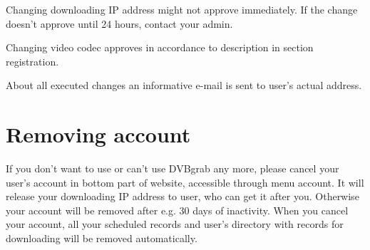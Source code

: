 Changing downloading IP address might not approve immediately. If the change doesn't approve until 24 hours, contact your admin.

Changing video codec approves in accordance to description in section registration.

About all executed changes an informative e-mail is sent to user's actual address.

\section{Removing account}
If you don't want to use or can't use DVBgrab any more, please cancel your user's account in bottom part of website, accessible through menu account. It will release your downloading IP address to user, who can get it after you. Otherwise your account will be removed after e.g. 30 days of inactivity. When you cancel your account, all your scheduled records and user's directory with records for downloading will be removed automatically.
\vfil
